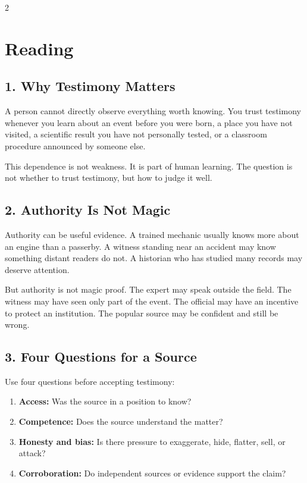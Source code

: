 \documentclass[12pt]{article}
\begin{document}
\begin{multicols}{2}
\section*{Reading}

\subsection*{1. Why Testimony Matters}
A person cannot directly observe everything worth knowing. You trust testimony whenever you learn about an event before you were born, a place you have not visited, a scientific result you have not personally tested, or a classroom procedure announced by someone else.

This dependence is not weakness. It is part of human learning. The question is not whether to trust testimony, but how to judge it well.

\subsection*{2. Authority Is Not Magic}
Authority can be useful evidence. A trained mechanic usually knows more about an engine than a passerby. A witness standing near an accident may know something distant readers do not. A historian who has studied many records may deserve attention.

But authority is not magic proof. The expert may speak outside the field. The witness may have seen only part of the event. The official may have an incentive to protect an institution. The popular source may be confident and still be wrong.

\subsection*{3. Four Questions for a Source}
Use four questions before accepting testimony:
\begin{enumerate}[leftmargin=*,itemsep=0.12em]
\item \textbf{Access:} Was the source in a position to know?
\item \textbf{Competence:} Does the source understand the matter?
\item \textbf{Honesty and bias:} Is there pressure to exaggerate, hide, flatter, sell, or attack?
\item \textbf{Corroboration:} Do independent sources or evidence support the claim?
\end{enumerate}


\end{multicols}
\end{document}
